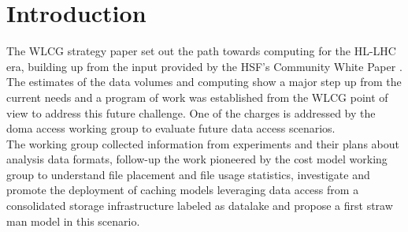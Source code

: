 \section{Introduction}
The WLCG \cite{wlcg} strategy paper set out the path towards computing for the HL-LHC era, building up from the input provided by the HSF's \cite{hsf} Community White Paper \cite{cwp}.
The estimates of the data volumes and computing show a major step up from the current needs and a program of work was established from the WLCG point of view to address this future challenge. One of the charges is addressed by the doma access working group to evaluate future data access scenarios.\\
The working group collected information from experiments and their plans about analysis data formats, follow-up the work pioneered by the cost model working group to understand file placement and file usage statistics, investigate and promote the deployment of caching models leveraging data access from a consolidated storage infrastructure labeled as datalake and propose a first straw man model in this scenario.



